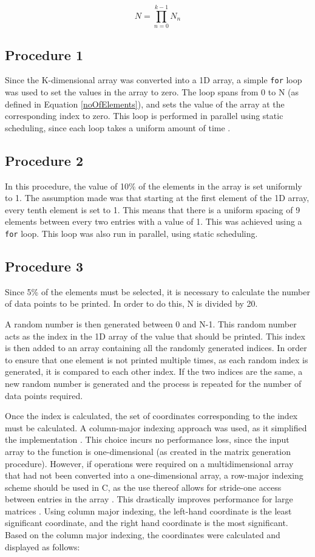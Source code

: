 \documentclass[10pt,twocolumn]{witseiepaper}
\begin{document}
\begin{equation}
N = \prod_{n=0}^{k-1}N_{n}
\label{noOfElements}
\end{equation}

\subsection{Procedure 1}
Since the K-dimensional array was converted into a 1D array, a simple \texttt{for} loop was used to set the values in the array to zero. The loop spans from 0 to N (as defined in Equation \ref{noOfElements}), and sets the value of the array at the corresponding index to zero. This loop is performed in parallel using static scheduling, since each loop takes a uniform amount of time \cite{HPC}.

\subsection{Procedure 2}
In this procedure, the value of 10\% of the elements in the array is set uniformly to 1. The assumption made was that starting at the first element of the 1D array, every tenth element is set to 1. This means that there is a uniform spacing of 9 elements between every two entries with a value of 1. This was achieved using a \texttt{for} loop. This loop was also run in parallel, using static scheduling. 

\subsection{Procedure 3}
Since 5\% of the elements must be selected, it is necessary to calculate the number of data points to be printed. In order to do this, N is divided by 20.

A random number is then generated between 0 and N-1. This random number acts as the index in the 1D array of the value that should be printed. This index is then added to an array containing all the randomly generated indices. In order to ensure that one element is not printed multiple times, as each random index is generated, it is compared to each other index. If the two indices are the same, a new random number is generated and the process is repeated for the number of data points required.

Once the index is calculated, the set of coordinates corresponding to the index must be calculated. A column-major indexing approach was used, as it simplified the implementation \cite{HPC}. This choice incurs no performance loss, since the input array to the function is one-dimensional (as created in the matrix generation procedure). However, if operations were required on a multidimensional array that had not been converted into a one-dimensional array, a row-major indexing scheme should be used in C, as the use thereof allows for stride-one access between entries in the array \cite{HPC}. This drastically improves performance for large matrices \cite{HPC}. Using column major indexing, the left-hand coordinate is the least significant coordinate, and the right hand coordinate is the most significant. Based on the column major indexing, the coordinates were calculated and displayed as follows:
\end{document}
